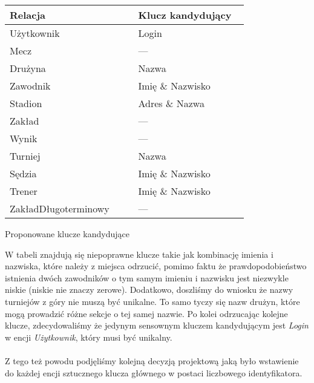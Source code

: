 \documentclass{mwrep}[15pt]
\begin{document}
\vspace{1cm}
\begin{threeparttable}[H]
	\begin{tabular}{|p{0.5\linewidth}|p{0.43\linewidth}|}
	\hline
	Relacja & Klucz kandydujący \\ \hline
	Użytkownik & Login \\ \hline
	Mecz &  --- \\ \hline
	Drużyna &  Nazwa \\ \hline
	Zawodnik &  Imię \& Nazwisko \\ \hline
	Stadion &  Adres \& Nazwa \\ \hline
	Zakład &  --- \\ \hline
	Wynik &  --- \\ \hline
	Turniej &  Nazwa \\ \hline
	Sędzia & Imię \& Nazwisko \\ \hline
	Trener & Imię \& Nazwisko \\ \hline
	ZakładDługoterminowy &  --- \\ \hline
	\end{tabular}	
	\caption{Proponowane klucze kandydujące}
\end{threeparttable}
\vspace{1cm}

W tabeli znajdują się niepoprawne klucze takie jak kombinację imienia i nazwiska, które należy z miejsca odrzucić, pomimo faktu że prawdopodobieństwo
istnienia dwóch zawodników o tym samym imieniu i nazwisku jest niezwykle niskie (niskie nie znaczy zerowe). 
Dodatkowo, doszliśmy do wniosku że nazwy turniejów z góry nie muszą być unikalne. To samo tyczy się nazw drużyn, które mogą
prowadzić różne sekcje o tej samej nazwie. Po kolei odrzucając kolejne klucze, zdecydowaliśmy że jedynym sensownym kluczem kandydującym
jest \emph{Login} w encji \emph{Użytkownik}, który musi być unikalny. \\
\\
Z tego też powodu podjęliśmy kolejną decyzją projektową jaką było wstawienie do każdej encji sztucznego klucza głównego 
w postaci liczbowego identyfikatora. 
\end{document}
